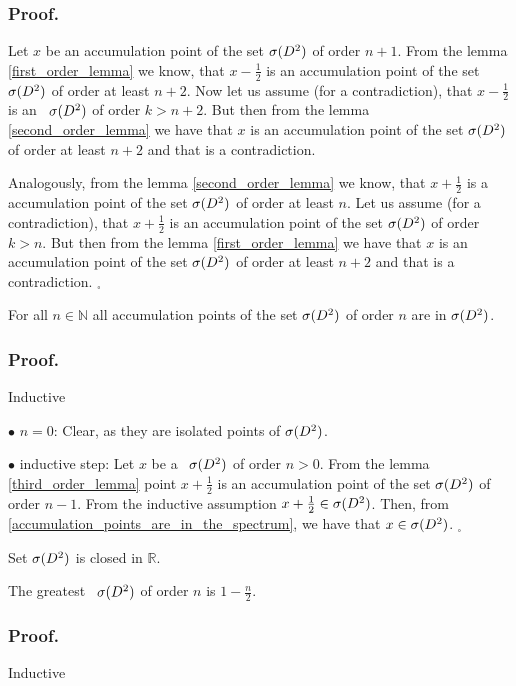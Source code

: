 \subsubsection{Proof.} 

Let $x$ be an accumulation point of the set ${{\sigma}(D^2)}$ of order $n+1$. From the lemma 
 \ref{first_order_lemma} we know, that $x - \frac{1}{2}$ is an accumulation point of the set 
 ${{\sigma}(D^2)}$ of order at least $n+2$. Now let us assume (for a contradiction), that $x - \frac{1}{2}$ 
 is an \apots\ ${{\sigma}(D^2)}$ of order $k>n+2$. But then from the lemma \ref{second_order_lemma} 
 we have that $x$ is an accumulation point of the set ${{\sigma}(D^2)}$ of order at least $n+2$ and that 
 is a contradiction. 
 
Analogously, from the lemma \ref{second_order_lemma} we know, that $x + \frac{1}{2}$ is a 
accumulation point of the set ${{\sigma}(D^2)}$ of order at least $n$. Let us assume (for a contradiction), 
that $x+ \frac{1}{2}$ is an accumulation point of the set ${{\sigma}(D^2)}$ of order $k>n$. But then 
from the lemma \ref{first_order_lemma} we have that $x$ is an accumulation point of 
the set ${{\sigma}(D^2)}$ 
of order at least $n+2$ and that is a contradiction. $_\square$ 
\begin{lemma}\label{accumulation_points_of_the_set}
For all $n \in \mathbb{N}$ all accumulation points of the set ${{\sigma}(D^2)}$ of order $n$ are in ${{\sigma}(D^2)}$.
\end{lemma}
\subsubsection{Proof.}
Inductive 

$\bullet$ $n=0$: Clear, as they are isolated points of ${{\sigma}(D^2)}$. 

$\bullet$ inductive step: Let $x$ be a \apots\  ${{\sigma}(D^2)}$ of order $n>0$. From the lemma 
\ref{third_order_lemma} point $x+\frac{1}{2}$ is an accumulation point of the set ${{\sigma}(D^2)}$  
of order $n-1$. From the inductive assumption $x+\frac{1}{2} \in {{\sigma}(D^2)}$. Then, 
from \ref{accumulation_points_are_in_the_spectrum}, we have that $x \in {{\sigma}(D^2)}$. 
$_\square$ 

\begin{corollary}
Set ${{\sigma}(D^2)}$ is closed in $\mathbb{R}$.
\end{corollary}

\begin{theorem}\label{greatest \apots}
The greatest \apots\ ${{\sigma}(D^2)}$ of order $n$ is $1-\frac{n}{2}$.
\end{theorem}
\subsubsection{Proof.}
Inductive 

